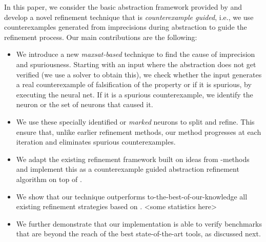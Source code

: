 
In this paper, we consider the basic abstraction framework provided by \deeppoly{} and develop a novel refinement technique that is {\em counterexample guided}, i.e., we use counterexamples generated from imprecisions during abstraction to guide the refinement process. Our main contributions are the following:
\begin{itemize}
\item We introduce a new {\em maxsat-based} technique to find the cause of imprecision and spuriousness. Starting with an input where the abstraction does not get verified (we use a \milp{} solver to obtain this), we check whether the input generates a real counterexample of falsification of the property or if it is spurious, by executing the neural net. If it is a spurious counterexample, we identify the neuron or the set of neurons that caused it.  
\item We use these specially identified or {\em marked} neurons to split and refine. This ensure that, unlike earlier refinement methods, our method progresses at each iteration and eliminates spurious counterexamples.
\item We adapt the existing refinement framework built on ideas from \milp{}-methods and implement this as a counterexample guided abstraction refinement algorithm on top of \deeppoly{}.
\item We show that our technique outperforms to-the-best-of-our-knowledge all existing refinement strategies based on \deeppoly{}. <some statistics  here>
\item We further demonstrate that our implementation is able to verify benchmarks that are beyond the reach of the best state-of-the-art tools, as discussed next.
\end{itemize}

